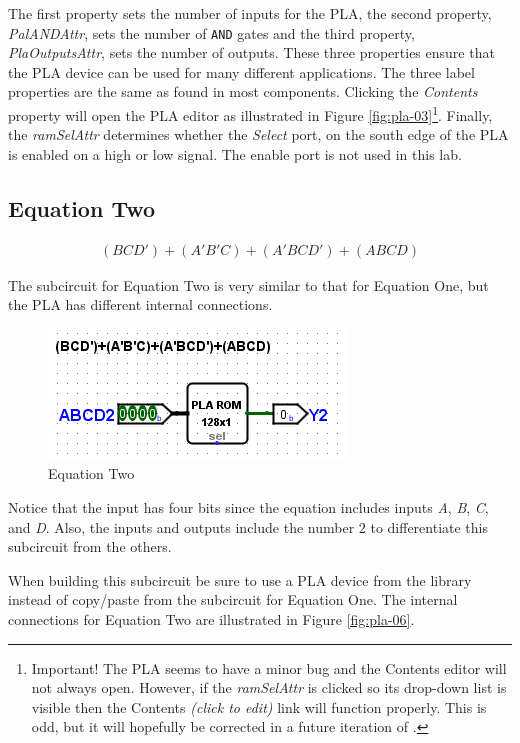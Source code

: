 The first property sets the number of inputs for the \ac{PLA}, the second property, \textit{PalANDAttr}, sets the number of \texttt{AND} gates and the third property, \textit{PlaOutputsAttr}, sets the number of outputs. These three properties ensure that the \ac{PLA} device can be used for many different applications. The three label properties are the same as found in most \LE components. Clicking the \textit{Contents} property will open the \ac{PLA} editor as illustrated in Figure \ref{fig:pla-03}\footnote{Important! The \LE \ac{PLA} seems to have a minor bug and the Contents editor will not always open. However, if the \textit{ramSelAttr} is clicked so its drop-down list is visible then the Contents \textit{(click to edit)} link will function properly. This is odd, but it will hopefully be corrected in a future iteration of \LE.}. Finally, the \textit{ramSelAttr} determines whether the \textit{Select} port, on the south edge of the \ac{PLA} is enabled on a high or low signal. The enable port is not used in this lab.

\subsection{Equation Two}

\begin{align}
	\label{eq:pla-02}
	(BCD')+(A'B'C)+(A'BCD')+(ABCD)
\end{align}

The subcircuit for Equation Two is very similar to that for Equation One, but the \ac{PLA} has different internal connections.

\begin{figure}[H]
	\centering
	\includegraphics[width=\maxwidth{.95\linewidth}]{gfx/pla-04}
	\caption{Equation Two}
	\label{fig:pla-05}
\end{figure}

Notice that the input has four bits since the equation includes inputs \textit{A}, \textit{B}, \textit{C}, and \textit{D}. Also, the inputs and outputs include the number $ 2 $ to differentiate this subcircuit from the others.

When building this subcircuit be sure to use a \ac{PLA} device from the library instead of copy/paste from the subcircuit for Equation One. The internal connections for Equation Two are illustrated in Figure \ref{fig:pla-06}.

